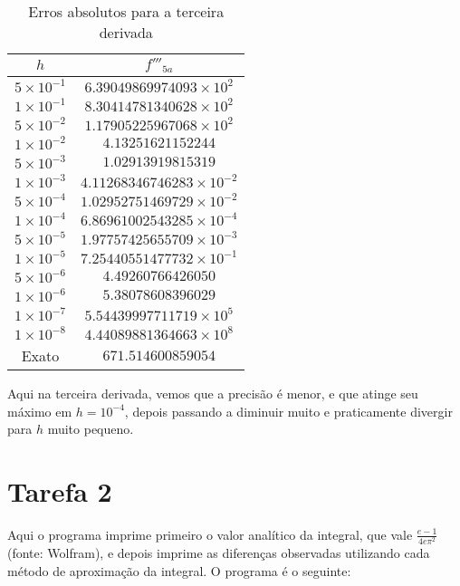 \documentclass[12pt,a4paper]{article}
\begin{document}
\begin{table}[H]
\centering
\begin{tabular}{|c|c|}
\hline
$h$ & $f'''_{5a}$ \\ \hline
$5 \times 10^{-1}$ & $6.39049869974093 \times 10^{2}$ \\ \hline
$1 \times 10^{-1}$ & $8.30414781340628 \times 10^{2}$ \\ \hline
$5 \times 10^{-2}$ & $1.17905225967068 \times 10^{2}$ \\ \hline
$1 \times 10^{-2}$ & $4.13251621152244$ \\ \hline
$5 \times 10^{-3}$ & $1.02913919815319$ \\ \hline
$1 \times 10^{-3}$ & $4.11268346746283 \times 10^{-2}$ \\ \hline
$5 \times 10^{-4}$ & $1.02952751469729 \times 10^{-2}$ \\ \hline
$1 \times 10^{-4}$ & $6.86961002543285 \times 10^{-4}$ \\ \hline
$5 \times 10^{-5}$ & $1.97757425655709 \times 10^{-3}$ \\ \hline
$1 \times 10^{-5}$ & $7.25440551477732 \times 10^{-1}$ \\ \hline
$5 \times 10^{-6}$ & $4.49260766426050$ \\ \hline
$1 \times 10^{-6}$ & $5.38078608396029$ \\ \hline
$1 \times 10^{-7}$ & $5.54439997711719 \times 10^{5}$ \\ \hline
$1 \times 10^{-8}$ & $4.44089881364663 \times 10^{8}$ \\ \hline
Exato & $671.514600859054$ \\ \hline
\end{tabular}
\caption{Erros absolutos para a terceira derivada}
\end{table}

Aqui na terceira derivada, vemos que a precisão é menor, e que atinge seu máximo em $h = 10^{-4}$, depois passando a diminuir muito e praticamente divergir para $h$ muito pequeno.

\section{Tarefa 2}

Aqui o programa imprime primeiro o valor analítico da integral, que vale $\frac{e-1}{4e\pi^2}$ (fonte: Wolfram), e depois imprime as diferenças observadas utilizando cada método de aproximação da integral. O programa é o seguinte:
\end{document}
